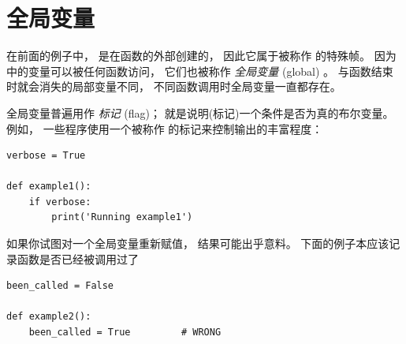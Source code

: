 \section{全局变量}

  


在前面的例子中，  是在函数的外部创建的，
因此它属于被称作  的特殊帧。
因为  中的变量可以被任何函数访问， 它们也被称作 {\em 全局变量} (global) 。   与函数结束时就会消失的局部变量不同， 不同函数调用时全局变量一直都存在。



全局变量普遍用作 {\em 标记} (flag)； 就是说明(标记)一个条件是否为真的布尔变量。
例如， 一些程序使用一个被称作  的标记来控制输出的丰富程度：

\begin{lstlisting}
verbose = True

def example1():
    if verbose:
        print('Running example1')
\end{lstlisting}

%

如果你试图对一个全局变量重新赋值， 结果可能出乎意料。
下面的例子本应该记录函数是否已经被调用过了


\begin{lstlisting}
been_called = False

def example2():
    been_called = True         # WRONG
\end{lstlisting}

%

